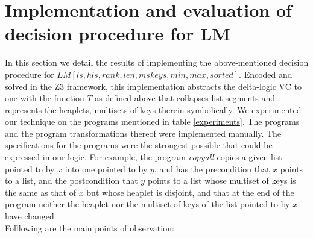 \section{Implementation and evaluation of decision procedure for LM}
In this section we detail the results of implementing the above-mentioned decision procedure for $LM[ls, hls, rank, len, mskeys, min, max, sorted]$. Encoded and solved in the Z3 framework, this implementation abstracts the delta-logic VC to one with the function $T$ as defined above that collapses list segments and represents the heaplets,  multisets of keys  therein symbolically. We experimented our technique on the programs mentioned in table \ref{experiments}. The programs and the program transformations thereof were implemented manually. The specifications for the programs were the strongest possible that could be expressed in our logic. For example, the program \textit{copyall} copies a given list pointed to by $x$ into one pointed to by $y$, and has the precondition that $x$ points to a list, and the postcondition that $y$ points to a list whose multiset of keys is the same as that of $x$ but whose heaplet is disjoint, and that at the end of the program neither the heaplet nor the multiset of keys of the list pointed to by $x$ have changed.\\
Folllowing are the main points of observation:
